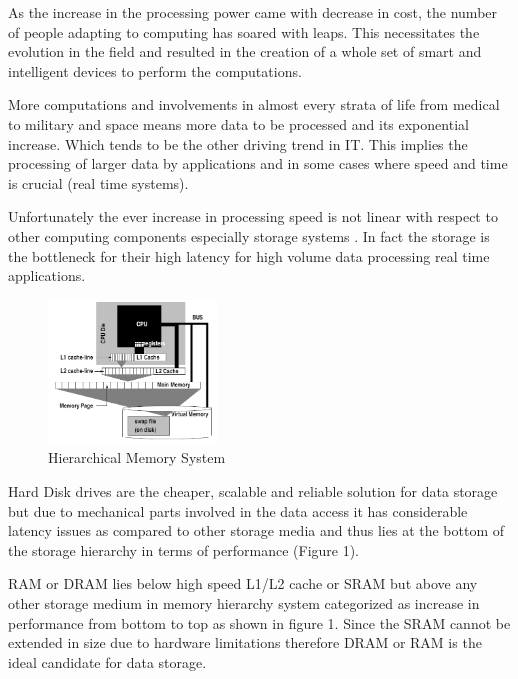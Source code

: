 \documentclass[10pt]{article} %
\begin{document}
As the increase in the processing power came with decrease in cost, the number of people adapting to computing has soared with leaps. This necessitates the evolution in the field and resulted in the creation of a whole set of smart and intelligent devices to perform the computations. 

More computations and involvements in almost every strata of life from medical to military and space means more data to be processed and its exponential increase. Which tends to be the other driving trend in IT. This implies the processing of larger data by applications and in some cases where speed and time is crucial (real time systems).

Unfortunately the ever increase in processing speed is not linear with respect to other computing components especially storage systems \cite{boncz1999database}. In fact the storage is the bottleneck for their high latency for high volume data processing real time applications. 

\begin{figure}
  \begin{center}
    \includegraphics[width=0.4\textwidth]{./pictures/Fig1}
  \end{center}
  \caption{Hierarchical Memory System}
  \label{fig:fig1}
\end{figure}

Hard Disk drives are the cheaper, scalable and reliable solution for data storage but due to mechanical parts involved in the data access it has considerable latency issues as compared to other storage media and thus lies at the bottom of the storage hierarchy in terms of performance (Figure 1).

RAM or DRAM lies below high speed L1/L2 cache or SRAM but above any other storage medium in memory hierarchy system categorized as increase in performance from bottom to top as shown in figure 1. Since the SRAM cannot be extended in size due to hardware limitations therefore DRAM or RAM is the ideal candidate for data storage.
\end{document}
